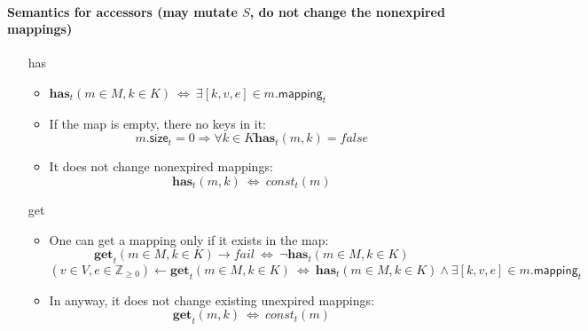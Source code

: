 \documentclass{article}
\renewcommand{\o}[1]{\ensuremath{\mathbf{#1}}}
\newcommand{\p}[1]{\ensuremath{\mathit{#1}}}
\newcommand{\s}[1]{\ensuremath{\mathsf{#1}}}
\newcommand{\nintset}{\ensuremath{\mathds{Z}_{\ge 0}}}
\begin{document}
\paragraph{Semantics for accessors (may mutate $S$, do not change the nonexpired mappings)}
\begin{itemize}
   \item[has]
     \begin{itemize}
       \item $\o{has}_t(m \in M, k \in K) ~\Leftrightarrow~ \exists [k,v,e] \in m.\s{mapping}_t$\\
       \item If the map is empty, there no keys in it:\\
         $$m.\s{size}_t=0 \Rightarrow \forall k\in K \o{has}_t(m, k) = false $$
       \item It does not change nonexpired mappings:\\
         $$\o{has}_t(m, k) ~\Leftrightarrow~ \p{const}_t(m)$$
     \end{itemize}
     \item[get]
       \begin{itemize}
         \item One can get a mapping only if it exists in the map:\\
           $$\o{get}_t(m \in M, k \in K) \rightarrow fail ~\Leftrightarrow~ \neg\o{has}_t(m \in M, k \in K)$$
           $$(v\in V,e\in \nintset)\gets \o{get}_t(m \in M, k \in K) ~\Leftrightarrow~ \o{has}_t(m \in M, k \in K) \wedge \exists [k,v,e] \in m.\s{mapping}_t$$
         \item In anyway, it does not change existing unexpired mappings:\\
           $$\o{get}_t(m, k) ~\Leftrightarrow~ \p{const}_t(m)$$
       \end{itemize}
\end{itemize}
\end{document}
